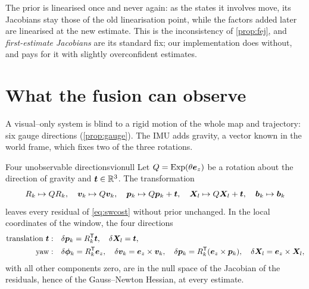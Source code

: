 The prior is linearised once and never again: as the states it involves
move, its Jacobians stay those of the old linearisation point, while the
factors added later are linearised at the new estimate. This is the
inconsistency of \cref{prop:fej}, and \emph{first-estimate Jacobians}
are its standard fix; our implementation does without, and pays for it
with slightly overconfident estimates.

\section{What the fusion can observe}

A visual--only system is blind to a rigid motion of the whole map and
trajectory: six gauge directions (\cref{prop:gauge}). The IMU adds
gravity, a vector known in the world frame, which fixes two of the
three rotations.

\begin{theorem}{Four unobservable directions}{vionull}
Let $Q=\operatorname{Exp}(\theta\bm{e}_z)$ be a rotation about the direction of
gravity and $\bm{t}\in\mathbb{R}^3$. The transformation
\[
R_k\mapsto QR_k,\quad\bm{v}_k\mapsto Q\bm{v}_k,\quad\bm{p}_k\mapsto Q\bm{p}_k+
\bm{t},\quad\bm{X}_l\mapsto Q\bm{X}_l+\bm{t},\quad\bm{b}_k
\mapsto\bm{b}_k
\]
leaves every residual of \eqref{eq:swcost} without prior unchanged. In
the local coordinates of the window, the four directions
\begin{equation}\label{eq:vionull}
\begin{aligned}
\text{translation }\bm{t}:&\quad\delta\bm{p}_k=R_k^{\mathsf{T}}\bm{t},\quad
\delta\bm{X}_l=\bm{t},\\
\text{yaw}:&\quad\delta\bm{\phi}_k=R_k^{\mathsf{T}}\bm{e}_z,\quad\delta\bm{v}_k=
\bm{e}_z\times\bm{v}_k,\quad\delta\bm{p}_k=R_k^{\mathsf{T}}(\bm{e}_z\times\bm{p}_k),\quad
\delta\bm{X}_l=\bm{e}_z\times\bm{X}_l,
\end{aligned}
\end{equation}
with all other components zero, are in the null space of the Jacobian of
the residuals, hence of the Gauss--Newton Hessian, at every estimate.
\end{theorem}

